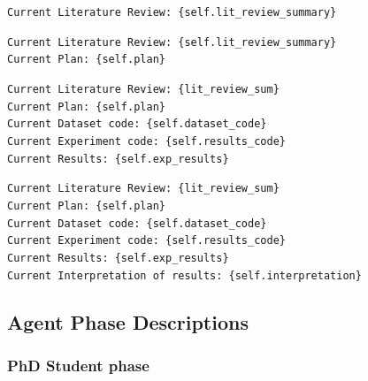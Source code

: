 \documentclass[11pt, a4paper]{gdm_format}
\begin{document}
\begin{tcolorbox}[breakable,colback=orange!5!white, colframe=orange!80!black, title=Context Prompt Plan Formulation]
\texttt{Current Literature Review: \{self.lit\_review\_summary\}}
\end{tcolorbox}


\begin{tcolorbox}[breakable,colback=orange!5!white, colframe=orange!80!black, title=Context Prompt Data Preparation]
\texttt{Current Literature Review: \{self.lit\_review\_summary\}\\Current Plan: \{self.plan\}}
\end{tcolorbox}

\begin{tcolorbox}[breakable,colback=orange!5!white, colframe=orange!80!black, title=Context Prompt Results Interpretation]
\texttt{Current Literature Review: \{lit\_review\_sum\}\\Current Plan: \{self.plan\}\\Current Dataset code: \{self.dataset\_code\}\\Current Experiment code: \{self.results\_code\}\\Current Results: \{self.exp\_results\}}
\end{tcolorbox}


\begin{tcolorbox}[breakable,colback=orange!5!white, colframe=orange!80!black, title=Context Prompt Report Refinement]
\texttt{Current Literature Review: \{lit\_review\_sum\}\\Current Plan: \{self.plan\}\\Current Dataset code: \{self.dataset\_code\}\\Current Experiment code: \{self.results\_code\}\\Current Results: \{self.exp\_results\}\\Current Interpretation of results: \{self.interpretation\}}
\end{tcolorbox}



\subsection{Agent Phase Descriptions}

\subsubsection{PhD Student phase} 
\end{document}
